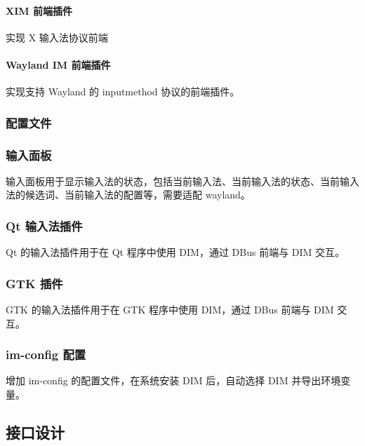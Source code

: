 \documentclass{utart}
\begin{document}
            \paragraph{XIM 前端插件}
                \par 实现 X 输入法协议前端

            \paragraph{Wayland IM 前端插件}
                \par 实现支持 Wayland 的 inputmethod 协议的前端插件。

        \subsubsection{配置文件}
        \subsubsection{输入面板}
            \par 输入面板用于显示输入法的状态，包括当前输入法、当前输入法的状态、当前输入法的候选词、当前输入法的配置等，需要适配 wayland。

        \subsubsection{Qt 输入法插件}
            \par Qt 的输入法插件用于在 Qt 程序中使用 DIM，通过 DBus 前端与 DIM 交互。

        \subsubsection{GTK 插件}
            \par GTK 的输入法插件用于在 GTK 程序中使用 DIM，通过 DBus 前端与 DIM 交互。

        \subsubsection{im-config 配置}
            \par 增加 im-config 的配置文件，在系统安装 DIM 后，自动选择 DIM 并导出环境变量。

    \subsection{接口设计}
\end{document}
